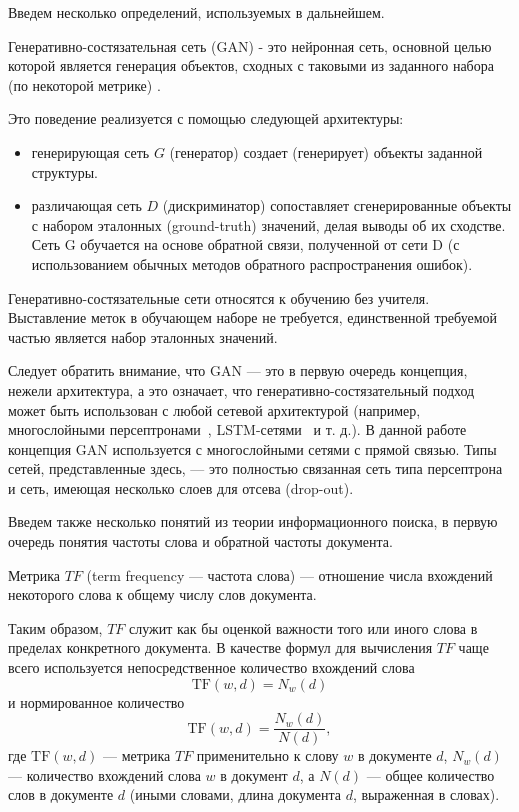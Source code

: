 Введем несколько определений, используемых в дальнейшем.
\begin{defn}
    Генеративно-состязательная сеть (GAN) - это нейронная сеть, основной целью которой является генерация объектов, 
    сходных с таковыми из заданного набора (по некоторой метрике) \cite{10.5555/2969033.2969125}.    
\end{defn}
Это поведение реализуется с помощью следующей архитектуры:
\begin{itemize}
    \item генерирующая сеть $G$ (генератор) создает (генерирует) объекты заданной структуры.
    \item различающая сеть $D$ (дискриминатор) сопоставляет сгенерированные объекты с набором эталонных (ground-truth) значений, 
    делая выводы об их сходстве. Сеть G обучается на основе обратной связи, полученной от сети D (с использованием обычных
    методов обратного распространения ошибок).  
\end{itemize}
Генеративно-состязательные сети относятся к обучению без учителя. Выставление меток в обучающем наборе не требуется, 
единственной требуемой частью является набор эталонных значений.

Следует обратить внимание, что GAN --- это в первую очередь концепция, нежели архитектура, а это означает, что 
генеративно-состязательный подход может быть использован с любой сетевой архитектурой (например, многослойными 
персептронами~\cite{Rosenblatt1958ThePA}, LSTM-сетями~\cite{10.1162/neco.1997.9.8.1735} и т. д.). В данной работе 
концепция GAN используется с многослойными сетями с прямой связью.
Типы сетей, представленные здесь, --- это полностью связанная сеть типа персептрона и сеть, имеющая несколько слоев для отсева
(drop-out).

Введем также несколько понятий из теории информационного поиска, в первую очередь понятия частоты слова и обратной частоты документа.

\begin{defn}
    Метрика $TF$ (term frequency --- частота слова) --- отношение числа вхождений некоторого слова к общему числу слов документа.
\end{defn}
Таким образом, $TF$ служит как бы оценкой важности того или иного слова в пределах конкретного документа.
В качестве формул для вычисления $TF$ чаще всего используется непосредственное количество вхождений слова
\begin{equation}
    \label{eq:raw-tf}
    \text{TF}(w, d) = N_w(d)
\end{equation}
и нормированное количество
\begin{equation}
    \label{eq:norm-tf}
    \text{TF}(w, d) = \frac{N_w(d)}{N(d)},
\end{equation}
где $\text{TF}(w, d)$ --- метрика $TF$ применительно к слову $w$ в документе $d$, $N_w(d)$ --- количество вхождений слова $w$
в документ $d$, а $N(d)$ --- общее количество слов в документе $d$ (иными словами, длина документа $d$, выраженная в словах).

